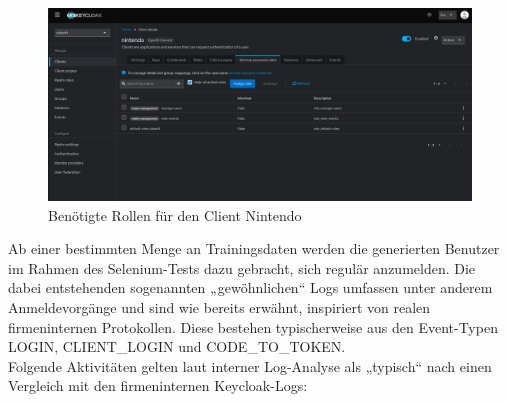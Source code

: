 \documentclass[a4paper,12pt]{article}
\begin{document}
	\begin{figure}[H]
		\centering
		\includegraphics[width=0.9\linewidth]{Bilder/screenshot012}
		\caption{Benötigte Rollen für den Client Nintendo}
		\label{fig:screenshot012}
	\end{figure}
	Ab einer bestimmten Menge an Trainingsdaten werden die generierten Benutzer im Rahmen des Selenium-Tests dazu gebracht, sich regulär anzumelden. Die dabei entstehenden sogenannten „gewöhnlichen“ Logs umfassen unter anderem Anmeldevorgänge und sind wie bereits erwähnt, inspiriert von realen firmeninternen Protokollen. Diese bestehen typischerweise aus den Event-Typen LOGIN, CLIENT\_LOGIN und CODE\_TO\_TOKEN.
	\\[0.5em]
	Folgende Aktivitäten gelten laut interner Log-Analyse als „typisch“ nach einen Vergleich mit den firmeninternen Keycloak-Logs:
	
\end{document}
